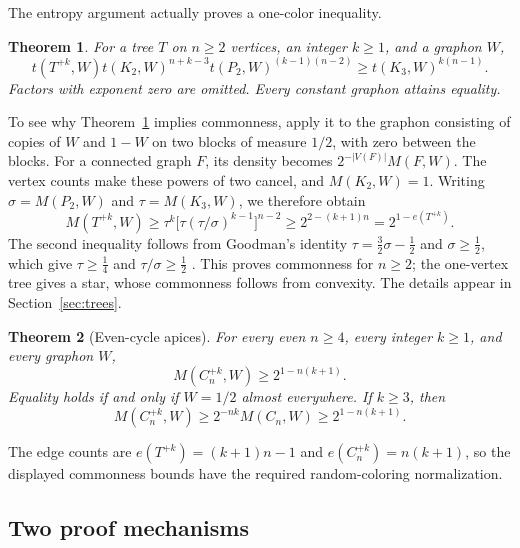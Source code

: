\documentclass[11pt,a4paper]{article}
\newtheorem{theorem}{Theorem}[section]
\theoremstyle{remark}
\numberwithin{equation}{section}
\begin{document}
The entropy argument actually proves a one-color inequality.

\begin{theorem}\label{thm:tree-one-color}
For a tree $T$ on $n\geq2$ vertices, an integer $k\geq1$, and a
graphon $W$,
\begin{equation}\label{eq:tree-one-color}
 t(T^{+k},W)t(K_2,W)^{n+k-3}
 t(P_2,W)^{(k-1)(n-2)}\geq t(K_3,W)^{k(n-1)}.
\end{equation}
Factors with exponent zero are omitted. Every constant graphon
attains equality.
\end{theorem}

To see why Theorem~\ref{thm:tree-one-color} implies commonness,
apply it to the graphon consisting of copies of $W$ and $1-W$ on
two blocks of measure $1/2$, with zero between the blocks. For a
connected graph $F$, its density becomes $2^{-|V(F)|}M(F,W)$.
The vertex counts make these powers of two cancel, and
$M(K_2,W)=1$. Writing $\sigma=M(P_2,W)$ and $\tau=M(K_3,W)$,
we therefore obtain
\[
 M(T^{+k},W)\geq
 \tau^k\bigl[\tau(\tau/\sigma)^{k-1}\bigr]^{n-2}
 \geq 2^{2-(k+1)n}=2^{1-e(T^{+k})}.
\]
The second inequality follows from Goodman's identity
$\tau=\tfrac32\sigma-\tfrac12$ and $\sigma\geq\tfrac12$, which
give $\tau\geq\tfrac14$ and $\tau/\sigma\geq\tfrac12$
\cite{Goodman}. This proves commonness for $n\geq2$; the
one-vertex tree gives a star, whose commonness follows from
convexity. The details appear in Section~\ref{sec:trees}.

\begin{theorem}[Even-cycle apices]\label{thm:cycles}
For every even $n\geq4$, every integer $k\geq1$, and every graphon $W$,
\begin{equation}\label{eq:cycle-common}
 M(C_n^{+k},W)\geq2^{1-n(k+1)}.
\end{equation}
Equality holds if and only if $W=1/2$ almost everywhere.
If $k\geq3$, then
\begin{equation}\label{eq:cycle-relative}
 M(C_n^{+k},W)\geq2^{-nk}M(C_n,W)\geq2^{1-n(k+1)}.
\end{equation}
\end{theorem}

The edge counts are $e(T^{+k})=(k+1)n-1$ and
$e(C_n^{+k})=n(k+1)$, so the displayed commonness bounds have the
required random-coloring normalization.

\subsection{Two proof mechanisms}
\end{document}
